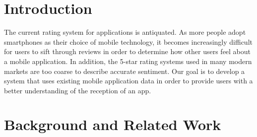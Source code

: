 \documentclass{acm_proc_article-sp}
\begin{document}
{%
}

\maketitle

\section{Introduction}
The current rating system for applications is antiquated. As more people adopt smartphones as their choice of mobile technology, it becomes increasingly
difficult for users to sift through reviews in order to determine how other users feel about a mobile application. In addition, the 5-star rating systems used in many modern markets are too coarse to describe accurate sentiment. Our goal is to develop a system that uses existing mobile application data in order to provide users with a better understanding of the reception of an app. 

\section{Background and Related Work}
\end{document}
